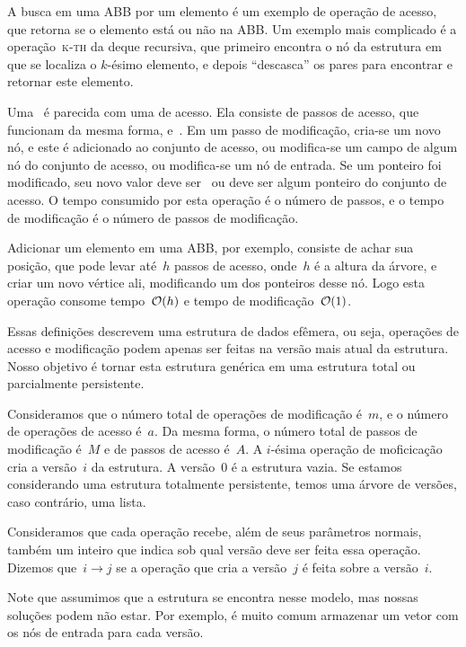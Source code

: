 \documentclass[../../main.tex]{subfiles}
\begin{document}
A busca em uma ABB por um elemento é um exemplo de operação de acesso, que retorna se o elemento está ou não na ABB. Um exemplo mais complicado é a operação~\textsc{k-th} da deque recursiva, que primeiro encontra o nó da estrutura em que se localiza o $k$-ésimo elemento, e depois ``descasca'' os pares para encontrar e retornar este elemento.

Uma~ é parecida com uma de acesso. Ela consiste de passos de acesso, que funcionam da mesma forma, e~. Em um passo de modificação, cria-se um novo nó, e este é adicionado ao conjunto de acesso, ou modifica-se um campo de algum nó do conjunto de acesso, ou modifica-se um nó de entrada. Se um ponteiro foi modificado, seu novo valor deve ser~ ou deve ser algum ponteiro do conjunto de acesso. O tempo consumido por esta operação é o número de passos, e o tempo de modificação é o número de passos de modificação.

Adicionar um elemento em uma ABB, por exemplo, consiste de achar sua posição, que pode levar até~$h$ passos de acesso, onde~$h$ é a altura da árvore, e criar um novo vértice ali, modificando um dos ponteiros desse nó. Logo esta operação consome tempo~$\mathcal{O}(h)$ e tempo de modificação~$\mathcal{O}(1)$.

Essas definições descrevem uma estrutura de dados efêmera, ou seja, operações de acesso e modificação podem apenas ser feitas na versão mais atual da estrutura. Nosso objetivo é tornar esta estrutura genérica em uma estrutura total ou parcialmente persistente.

Consideramos que o número total de operações de modificação é~$m$, e o número de operações de acesso é~$a$. Da mesma forma, o número total de passos de modificação é~$M$ e de passos de acesso é~$A$. A $i$-ésima operação de moficicação cria a versão~$i$ da estrutura. A versão~0 é a estrutura vazia. Se estamos considerando uma estrutura totalmente persistente, temos uma árvore de versões, caso contrário, uma lista.

Consideramos que cada operação recebe, além de seus parâmetros normais, também um inteiro que indica sob qual versão deve ser feita essa operação. Dizemos que~$i \rightarrow j$ se a operação que cria a versão~$j$ é feita sobre a versão~$i$.

Note que assumimos que a estrutura se encontra nesse modelo, mas nossas soluções podem não estar. Por exemplo, é muito comum armazenar um vetor com os nós de entrada para cada versão.
\end{document}
